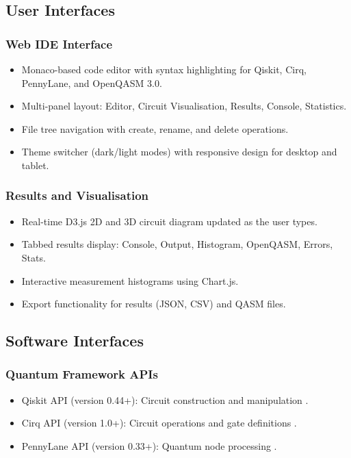 \subsection{User Interfaces}

\subsubsection{Web IDE Interface}
\begin{itemize}
    \item Monaco-based code editor with syntax highlighting for Qiskit, Cirq, PennyLane, and OpenQASM 3.0.
    \item Multi-panel layout: Editor, Circuit Visualisation, Results, Console, Statistics.
    \item File tree navigation with create, rename, and delete operations.
    \item Theme switcher (dark/light modes) with responsive design for desktop and tablet.
\end{itemize}

\subsubsection{Results and Visualisation}
\begin{itemize}
    \item Real-time D3.js 2D and 3D circuit diagram updated as the user types.
    \item Tabbed results display: Console, Output, Histogram, OpenQASM, Errors, Stats.
    \item Interactive measurement histograms using Chart.js.
    \item Export functionality for results (JSON, CSV) and QASM files.
\end{itemize}

\subsection{Software Interfaces}

\subsubsection{Quantum Framework APIs}
\begin{itemize}
    \item Qiskit API (version 0.44+): Circuit construction and manipulation \cite{qiskit}.
    \item Cirq API (version 1.0+): Circuit operations and gate definitions \cite{cirq_developers_2023}.
    \item PennyLane API (version 0.33+): Quantum node processing \cite{bergholm2018pennylane}.
\end{itemize}

